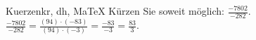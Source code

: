 \begin{MAufgabe}{Kuerzen}{kr, dh, MaTeX}
K\"urzen Sie soweit m\"oglich: $\frac{-7802}{-282}$.\\ 
\ifLsg\MLoesung
\quad $\frac{-7802}{-282}=\frac{(94)\cdot(-83)}{(94)\cdot(-3)}=\frac{-83}{-3}=\frac{83}{3}$.\else\relax\fi
 \end{MAufgabe}